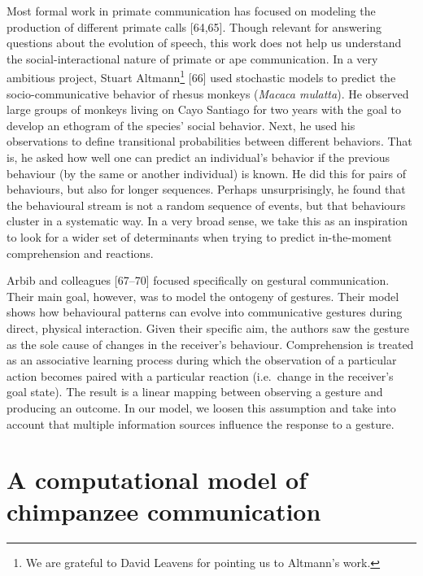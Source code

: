 \documentclass[
  man,floatsintext]{apa6}
\begin{document}
Most formal work in primate communication has focused on modeling the production of different primate calls {[}64,65{]}. Though relevant for answering questions about the evolution of speech, this work does not help us understand the social-interactional nature of primate or ape communication. In a very ambitious project, Stuart Altmann\footnote{We are grateful to David Leavens for pointing us to Altmann's work.} {[}66{]} used stochastic models to predict the socio-communicative behavior of rhesus monkeys (\emph{Macaca mulatta}). He observed large groups of monkeys living on Cayo Santiago for two years with the goal to develop an ethogram of the species' social behavior. Next, he used his observations to define transitional probabilities between different behaviors. That is, he asked how well one can predict an individual's behavior if the previous behaviour (by the same or another individual) is known. He did this for pairs of behaviours, but also for longer sequences. Perhaps unsurprisingly, he found that the behavioural stream is not a random sequence of events, but that behaviours cluster in a systematic way. In a very broad sense, we take this as an inspiration to look for a wider set of determinants when trying to predict in-the-moment comprehension and reactions.

Arbib and colleagues {[}67--70{]} focused specifically on gestural communication. Their main goal, however, was to model the ontogeny of gestures. Their model shows how behavioural patterns can evolve into communicative gestures during direct, physical interaction. Given their specific aim, the authors saw the gesture as the sole cause of changes in the receiver's behaviour. Comprehension is treated as an associative learning process during which the observation of a particular action becomes paired with a particular reaction (i.e.~change in the receiver's goal state). The result is a linear mapping between observing a gesture and producing an outcome. In our model, we loosen this assumption and take into account that multiple information sources influence the response to a gesture.

\hypertarget{a-computational-model-of-chimpanzee-communication}{%
\section{A computational model of chimpanzee communication}\label{a-computational-model-of-chimpanzee-communication}}
\end{document}
